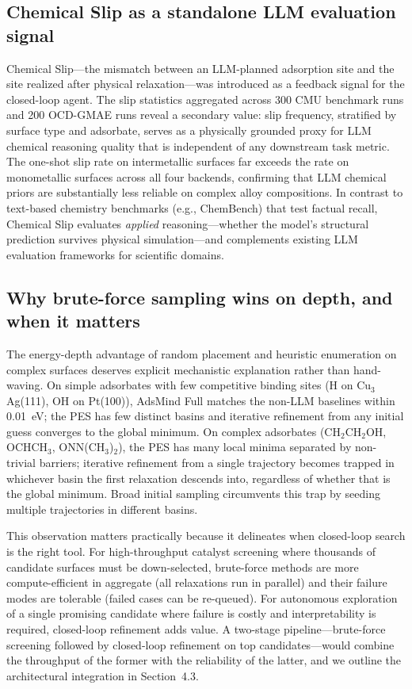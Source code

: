 \subsection{Chemical Slip as a standalone LLM evaluation signal}

Chemical Slip---the mismatch between an LLM-planned adsorption site and the site realized after physical relaxation---was introduced as a feedback signal for the closed-loop agent.
The slip statistics aggregated across 300 CMU benchmark runs and 200 OCD-GMAE runs reveal a secondary value: slip frequency, stratified by surface type and adsorbate, serves as a physically grounded proxy for LLM chemical reasoning quality that is independent of any downstream task metric.
The one-shot slip rate on intermetallic surfaces far exceeds the rate on monometallic surfaces across all four backends, confirming that LLM chemical priors are substantially less reliable on complex alloy compositions.
In contrast to text-based chemistry benchmarks (e.g., ChemBench) that test factual recall, Chemical Slip evaluates \textit{applied} reasoning---whether the model's structural prediction survives physical simulation---and complements existing LLM evaluation frameworks for scientific domains.

\subsection{Why brute-force sampling wins on depth, and when it matters}

The energy-depth advantage of random placement and heuristic enumeration on complex surfaces deserves explicit mechanistic explanation rather than hand-waving.
On simple adsorbates with few competitive binding sites (H on Cu$_3$Ag(111), OH on Pt(100)), AdsMind Full matches the non-LLM baselines within 0.01~eV; the PES has few distinct basins and iterative refinement from any initial guess converges to the global minimum.
On complex adsorbates (CH$_2$CH$_2$OH, OCHCH$_3$, ONN(CH$_3$)$_2$), the PES has many local minima separated by non-trivial barriers; iterative refinement from a single trajectory becomes trapped in whichever basin the first relaxation descends into, regardless of whether that is the global minimum.
Broad initial sampling circumvents this trap by seeding multiple trajectories in different basins.

This observation matters practically because it delineates when closed-loop search is the right tool.
For high-throughput catalyst screening where thousands of candidate surfaces must be down-selected, brute-force methods are more compute-efficient in aggregate (all relaxations run in parallel) and their failure modes are tolerable (failed cases can be re-queued).
For autonomous exploration of a single promising candidate where failure is costly and interpretability is required, closed-loop refinement adds value.
A two-stage pipeline---brute-force screening followed by closed-loop refinement on top candidates---would combine the throughput of the former with the reliability of the latter, and we outline the architectural integration in Section~4.3.

